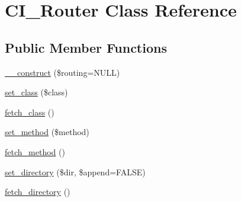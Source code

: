 \hypertarget{class_c_i___router}{}\section{C\+I\+\_\+\+Router Class Reference}
\label{class_c_i___router}
\subsection*{Public Member Functions}
\begin{DoxyCompactItemize}
\item 
\mbox{\hyperlink{class_c_i___router_af6992558cad4491d83f68403bf18cf71}{\+\_\+\+\_\+construct}} (\$routing=N\+U\+LL)
\item 
\mbox{\hyperlink{class_c_i___router_a4379dbff2fc2b00f520182b37b7fc24c}{set\+\_\+class}} (\$class)
\item 
\mbox{\hyperlink{class_c_i___router_a8aa125a391633531057aca68bf1eb81b}{fetch\+\_\+class}} ()
\item 
\mbox{\hyperlink{class_c_i___router_a46667ad877901441dd0cc33b9d25f454}{set\+\_\+method}} (\$method)
\item 
\mbox{\hyperlink{class_c_i___router_a23db4d137e36fa933f3d0e674bd057ad}{fetch\+\_\+method}} ()
\item 
\mbox{\hyperlink{class_c_i___router_a1123405950f5857a5f6b98d5c52290a4}{set\+\_\+directory}} (\$dir, \$append=F\+A\+L\+SE)
\item 
\mbox{\hyperlink{class_c_i___router_a2a9a8224fcd4a7b035b590018179e7e6}{fetch\+\_\+directory}} ()
\end{DoxyCompactItemize}
